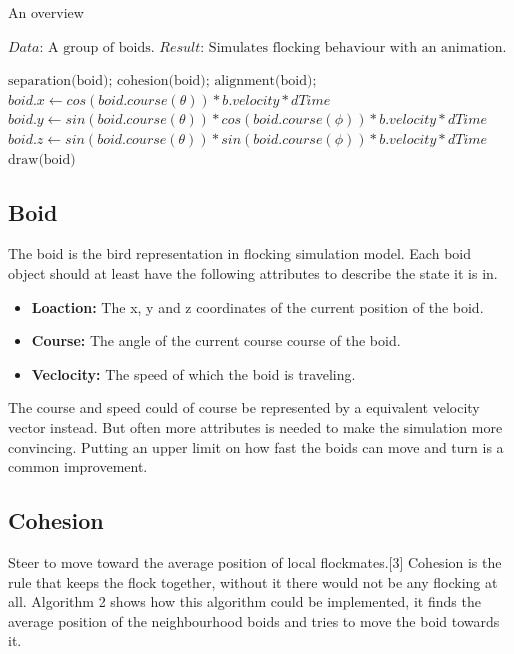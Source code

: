 \documentclass[12pt]{article}
\begin{document}
\begin{algorithm}
\caption{An overview}\label{euclid}
\begin{algorithmic}[1]
\State $\textit{Data:   } \text{A group of boids.}$
\State $\textit{Result:   } \text{Simulates flocking behaviour with an animation.}$

    \State $\text{separation(boid);} $
    \State $\text{cohesion(boid);} $
    \State $\text{alignment(boid);} $
    \EndFor
    \State $boid.x \gets cos(boid.course(\theta)) * b.velocity * dTime $
    \State $boid.y \gets sin(boid.course(\theta)) * cos(boid.course(\phi)) * b.velocity * dTime $
    \State $boid.z \gets sin(boid.course(\theta)) * sin(boid.course(\phi)) * b.velocity * dTime $
    \State $\text{draw(boid)} $
    \EndFor
\Endfor

\end{algorithmic}

\end{algorithm}

\subsection{Boid}
The boid is the bird representation in flocking simulation model. Each boid object should at least have the following attributes to describe the state it is in.

\begin{itemize}
    \item \textbf{Loaction: } The x, y and z coordinates of the current position of the boid.
    \item \textbf{Course: } The angle of the current course course of the boid.
    \item \textbf{Veclocity: } The speed of which the boid is traveling.
\end{itemize}
\bigbreak
The course and speed could of course be represented by a equivalent velocity vector instead. But often more attributes is needed to make the simulation more convincing. Putting an upper limit on how fast the boids can move and turn is a common improvement.

\subsection{Cohesion}

Steer to move toward the average position of local flockmates.[3] Cohesion is the rule that keeps the flock together, without it there would not be any flocking at all. Algorithm 2 shows how this algorithm could be implemented, it finds the average position of the neighbourhood boids and tries to move the boid towards it.
\end{document}
